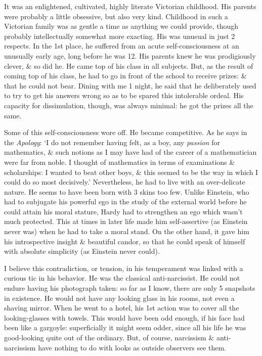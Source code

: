 \documentclass{article}
\numberwithin{equation}{section}
\begin{document}
It was an enlightened, cultivated, highly literate Victorian childhood. His parents were probably a little obsessive, but also very kind. Childhood in such a Victorian family was as gentle a time as anything we could provide, though probably intellectually somewhat more exacting. His was unusual in just 2 respects. In the 1st place, he suffered from an acute self-consciousness at an unusually early age, long before he was 12. His parents knew he was prodigiously clever, \& so did he. He came top of his class in all subjects. But, as the result of coming top of his class, he had to go in front of the school to receive prizes: \& that he could not bear. Dining with me 1 night, he said that he deliberately used to try to get his answers wrong so as to be spared this intolerable ordeal. His capacity for dissimulation, though, was always minimal: he got the prizes all the same.

Some of this self-consciousness wore off. He became competitive. As he says in the \textit{Apology}: `I do not remember having felt, as a boy, any \textit{passion} for mathematics, \& such notions as I may have had of the career of a mathematician were far from noble. I thought of mathematics in terms of examinations \& scholarships: I wanted to beat other boys, \& this seemed to be the way in which I could do so most decisively.' Nevertheless, he had to live with an over-delicate nature. He seems to have been born with 3 skins too few. Unlike Einstein, who had to subjugate his powerful ego in the study of the external world before he could attain his moral stature, Hardy had to strengthen an ego which wasn't much protected. This at times in later life made him self-assertive (as Einstein never was) when he had to take a moral stand. On the other hand, it gave him his introspective insight \& beautiful candor, so that he could speak of himself with absolute simplicity (as Einstein never could).

I believe this contradiction, or tension, in his temperament was linked with a curious tic in his behavior. He was the classical anti-narcissist. He could not endure having his photograph taken: so far as I know, there are only 5 snapshots in existence. He would not have any looking glass in his rooms, not even a shaving mirror. When he went to a hotel, his 1st action was to cover all the looking-glasses with towels. This would have been odd enough, if his face had been like a gargoyle: superficially it might seem odder, since all his life he was good-looking quite out of the ordinary. But, of course, narcissism \& anti-narcissism have nothing to do with looks as outside observers see them.
\end{document}
